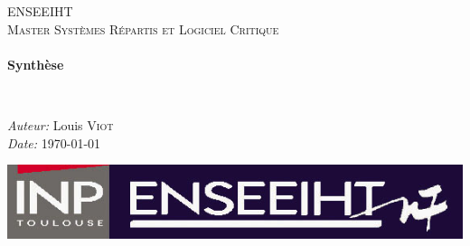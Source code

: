 \begin{titlepage}
\begin{center}

\textsc{\LARGE ENSEEIHT}\\[1.5cm]

\textsc{\Large Master Systèmes Répartis et Logiciel Critique}\\[0.5cm]

\HRule \\[0.4cm]
{ \huge \bfseries Synthèse \\[0.4cm] }

\HRule \\[1.5cm]
\end{center}

\vspace{3cm}
\begin{minipage}{0.9\textwidth} \large
\begin{flushleft}
\emph{Auteur:}
Louis \textsc{Viot}\\
\emph{Date:}
\today \\
\end{flushleft}
\end{minipage}
\vspace{6cm}
\begin{center}
\includegraphics[scale=1.5]{enseeiht.jpg}
\end{center}

\end{titlepage}





